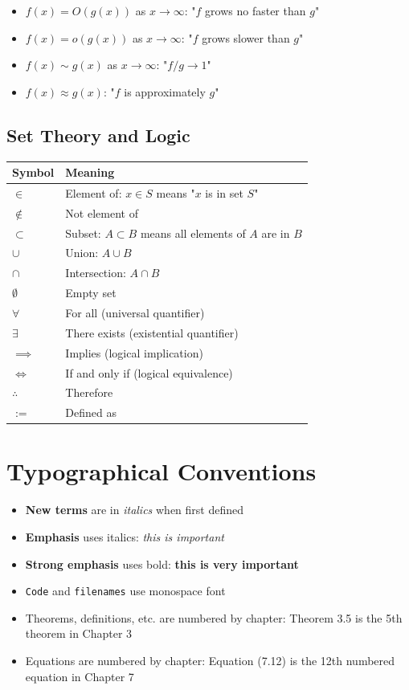 \begin{itemize}
\item $f(x) = O(g(x))$ as $x \to \infty$: "$f$ grows no faster than $g$"
\item $f(x) = o(g(x))$ as $x \to \infty$: "$f$ grows slower than $g$"
\item $f(x) \sim g(x)$ as $x \to \infty$: "$f/g \to 1$"
\item $f(x) \approx g(x)$: "$f$ is approximately $g$"
\end{itemize}

\subsection*{Set Theory and Logic}

\begin{center}
\begin{tabular}{ll}
\toprule
\textbf{Symbol} & \textbf{Meaning} \\
\midrule
$\in$ & Element of: $x \in S$ means "$x$ is in set $S$" \\
$\notin$ & Not element of \\
$\subset$ & Subset: $A \subset B$ means all elements of $A$ are in $B$ \\
$\cup$ & Union: $A \cup B$ \\
$\cap$ & Intersection: $A \cap B$ \\
$\emptyset$ & Empty set \\
$\forall$ & For all (universal quantifier) \\
$\exists$ & There exists (existential quantifier) \\
$\implies$ & Implies (logical implication) \\
$\iff$ & If and only if (logical equivalence) \\
$\therefore$ & Therefore \\
$:=$ & Defined as \\
\bottomrule
\end{tabular}
\end{center}

\section*{Typographical Conventions}

\begin{itemize}
\item \textbf{New terms} are in \textit{italics} when first defined
\item \textbf{Emphasis} uses italics: \textit{this is important}
\item \textbf{Strong emphasis} uses bold: \textbf{this is very important}
\item \texttt{Code} and \texttt{filenames} use monospace font
\item Theorems, definitions, etc. are numbered by chapter: Theorem 3.5 is the 5th theorem in Chapter 3
\item Equations are numbered by chapter: Equation (7.12) is the 12th numbered equation in Chapter 7
\end{itemize}

